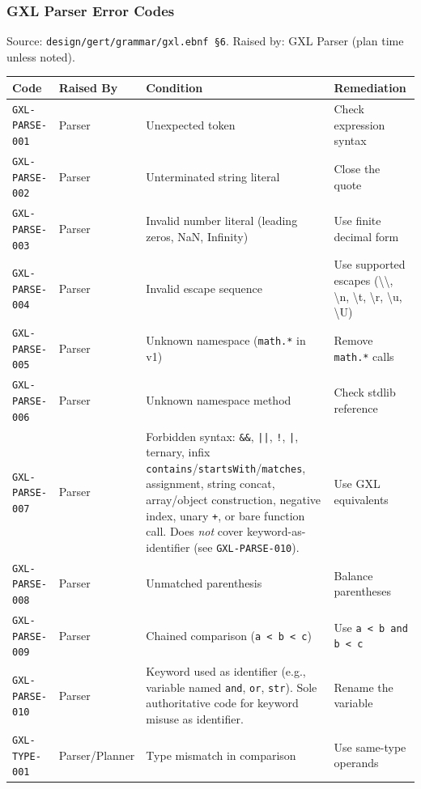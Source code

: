 \subsubsection{GXL Parser Error Codes}
\label{sec:parse-gate:error-codes:gxl}

Source: \texttt{design/gert/grammar/gxl.ebnf~\S6}.
Raised by: GXL Parser (plan time unless noted).

\begin{center}\small
\begin{tabular}{p{3.5cm}p{1.8cm}p{5.5cm}p{3.5cm}}
\hline
\textbf{Code} & \textbf{Raised By} & \textbf{Condition} & \textbf{Remediation} \\
\hline
\texttt{GXL-PARSE-001} & Parser & Unexpected token & Check expression syntax \\
\texttt{GXL-PARSE-002} & Parser & Unterminated string literal & Close the quote \\
\texttt{GXL-PARSE-003} & Parser & Invalid number literal (leading zeros, NaN, Infinity) & Use finite decimal form \\
\texttt{GXL-PARSE-004} & Parser & Invalid escape sequence & Use supported escapes (\textbackslash\textbackslash, \textbackslash n, \textbackslash t, \textbackslash r, \textbackslash u, \textbackslash U) \\
\texttt{GXL-PARSE-005} & Parser & Unknown namespace (\texttt{math.*} in v1) & Remove \texttt{math.*} calls \\
\texttt{GXL-PARSE-006} & Parser & Unknown namespace method & Check stdlib reference \\
\texttt{GXL-PARSE-007} & Parser & Forbidden syntax: \texttt{\&\&}, \texttt{||}, \texttt{!}, \texttt{|}, ternary, infix \texttt{contains}/\texttt{startsWith}/\texttt{matches}, assignment, string concat, array/object construction, negative index, unary \texttt{+}, or bare function call. Does \emph{not} cover keyword-as-identifier (see \texttt{GXL-PARSE-010}). & Use GXL equivalents \\
\texttt{GXL-PARSE-008} & Parser & Unmatched parenthesis & Balance parentheses \\
\texttt{GXL-PARSE-009} & Parser & Chained comparison (\texttt{a < b < c}) & Use \texttt{a < b and b < c} \\
\texttt{GXL-PARSE-010} & Parser & Keyword used as identifier (e.g., variable named \texttt{and}, \texttt{or}, \texttt{str}). Sole authoritative code for keyword misuse as identifier. & Rename the variable \\
\texttt{GXL-TYPE-001}  & Parser/Planner & Type mismatch in comparison & Use same-type operands \\

\end{tabular}
\end{center}
